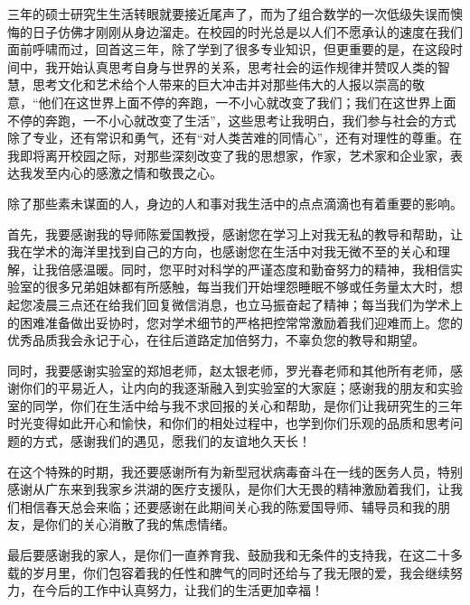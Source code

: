 
\thesisacknowledgement

三年的硕士研究生生活转眼就要接近尾声了，而为了组合数学的一次低级失误而懊悔的日子仿佛才刚刚从身边溜走。在校园的时光总是以人们不愿承认的速度在我们面前呼啸而过，回首这三年，除了学到了很多专业知识，但更重要的是，在这段时间中，我开始认真思考自身与世界的关系，思考社会的运作规律并赞叹人类的智慧，思考文化和艺术给个人带来的巨大冲击并对那些伟大的人报以崇高的敬意，“他们在这世界上面不停的奔跑，一不小心就改变了我们；我们在这世界上面不停的奔跑，一不小心就改变了生活”，这些思考让我明白，我们参与社会的方式除了专业，还有常识和勇气，还有“对人类苦难的同情心”，还有对理性的尊重。在我即将离开校园之际，对那些深刻改变了我的思想家，作家，艺术家和企业家，表达我发至内心的感激之情和敬畏之心。

除了那些素未谋面的人，身边的人和事对我生活中的点点滴滴也有着重要的影响。

首先，我要感谢我的导师陈爱国教授，感谢您在学习上对我无私的教导和帮助，让我在学术的海洋里找到自己的方向，也感谢您在生活中对我无微不至的关心和理解，让我倍感温暖。同时，您平时对科学的严谨态度和勤奋努力的精神，我相信实验室的很多兄弟姐妹都有所感触，每当我们开始埋怨睡眠不够或任务量太大时，想起您凌晨三点还在给我们回复微信消息，也立马振奋起了精神；每当我们为学术上的困难准备做出妥协时，您对学术细节的严格把控常常激励着我们迎难而上。您的优秀品质我会永记于心，在往后道路定加倍努力，不辜负您的教导和期望。

同时，我要感谢实验室的郑旭老师，赵太银老师，罗光春老师和其他所有老师，感谢你们的平易近人，让内向的我逐渐融入到实验室的大家庭；感谢我的朋友和实验室的同学，你们在生活中给与我不求回报的关心和帮助，是你们让我研究生的三年时光变得如此开心和愉快，和你们的相处过程中，也学到你们乐观的品质和思考问题的方式，感谢我们的遇见，愿我们的友谊地久天长！

在这个特殊的时期，我还要感谢所有为新型冠状病毒奋斗在一线的医务人员，特别感谢从广东来到我家乡洪湖的医疗支援队，是你们大无畏的精神激励着我们，让我们相信春天总会来临；还要感谢在此期间关心我的陈爱国导师、辅导员和我的朋友，是你们的关心消散了我的焦虑情绪。

最后要感谢我的家人，是你们一直养育我、鼓励我和无条件的支持我，在这二十多载的岁月里，你们包容着我的任性和脾气的同时还给与了我无限的爱，我会继续努力，在今后的工作中认真努力，让我们的生活更加幸福！